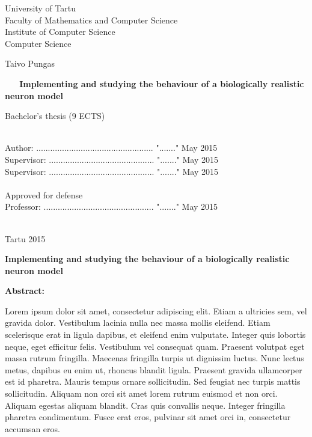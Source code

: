 \documentclass[a4paper,12pt]{report}
\theoremstyle{definition}
\newcommand{\thesistitle}{Implementing and studying the behaviour of a biologically realistic neuron model}
\begin{document}
\begin{center}
	{\Large
	University of Tartu\\
	Faculty of Mathematics and Computer Science\\
	Institute of Computer Science\\
	Computer Science\\}
	
	\vspace{2.5cm}
	
	{\LARGE Taivo Pungas}\\
	\vspace{0.5cm}
	\begin{spacing}{2}{\Huge\bf \ \ \ \thesistitle}\end{spacing}
	\vspace{0.5cm}
	{\LARGE Bachelor's thesis (9 ECTS)}
\end{center}
\vspace{3cm}
\hspace{7.2cm}{\Large Supervisors: Dr. Raul Vicente\\}
\vspace{-0.5cm}

\hspace{10.4cm}{\Large Dr. Jaan Aru \\}

\ \\
Author: .................................................. "......." May 2015\\
Supervisor: ............................................. "......." May 2015\\
Supervisor: ............................................. "......." May 2015\\
\ \\
Approved for defense\\
Professor: ............................................... "......." May 2015\\
\ \\
\begin{center}
	{\Large Tartu 2015}
\end{center}
\thispagestyle{empty}
\pagebreak




{\textbf
{\Large \thesistitle}}

\textbf{Abstract:}

Lorem ipsum dolor sit amet, consectetur adipiscing elit. Etiam a ultricies sem, vel gravida dolor. Vestibulum lacinia nulla nec massa mollis eleifend. Etiam scelerisque erat in ligula dapibus, et eleifend enim vulputate. Integer quis lobortis neque, eget efficitur felis. Vestibulum vel consequat quam. Praesent volutpat eget massa rutrum fringilla. Maecenas fringilla turpis ut dignissim luctus. Nunc lectus metus, dapibus eu enim ut, rhoncus blandit ligula. Praesent gravida ullamcorper est id pharetra. Mauris tempus ornare sollicitudin. Sed feugiat nec turpis mattis sollicitudin. Aliquam non orci sit amet lorem rutrum euismod et non orci. Aliquam egestas aliquam blandit. Cras quis convallis neque. Integer fringilla pharetra condimentum. Fusce erat eros, pulvinar sit amet orci in, consectetur accumsan eros.
\end{document}
